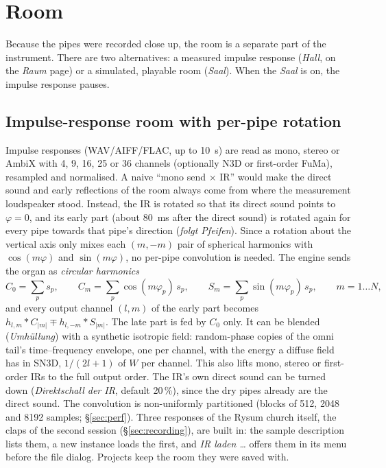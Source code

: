 \documentclass[11pt,a4paper,parskip=half,DIV=11,toc=bibliography]{scrartcl}
\newcommand{\ui}[1]{\emph{#1}}                 %
\begin{document}
\section{Room}
\label{sec:room}

Because the pipes were recorded close up, the room is a separate part of the instrument. There are two
alternatives: a measured impulse response (\ui{Hall}, on the \ui{Raum} page) or a simulated, playable
room (\ui{Saal}). When the \ui{Saal} is on, the impulse response pauses.

\subsection{Impulse-response room with per-pipe rotation}
\label{sec:ir}
Impulse responses (WAV/AIFF/FLAC, up to \SI{10}{s}) are read as mono, stereo or AmbiX with 4, 9, 16, 25 or
36 channels (optionally N3D or first-order FuMa), resampled and normalised. A naive \enquote{mono send
$\times$ IR} would make the direct sound and early reflections of the room always come from where the
measurement loudspeaker stood. Instead, the IR is rotated so that its direct sound points to $\varphi=0$,
and its early part (about \SI{80}{ms} after the direct sound) is rotated again for every pipe towards that
pipe's direction (\ui{folgt Pfeifen}). Since a rotation about the vertical axis only mixes each $(m,-m)$
pair of spherical harmonics with $\cos(m\varphi)$ and $\sin(m\varphi)$, no per-pipe convolution is needed.
The engine sends the organ as \emph{circular harmonics}
\begin{equation}
  C_0 = \sum_p s_p,\qquad C_m = \sum_p \cos(m\varphi_p)\, s_p,\qquad S_m = \sum_p \sin(m\varphi_p)\, s_p,
  \qquad m = 1\dots N,
\end{equation}
and every output channel $(l,m)$ of the early part becomes
$h_{l,m} * C_{|m|} \mp h_{l,-m} * S_{|m|}$. The late part is fed by $C_0$ only. It can be blended
(\ui{Umhüllung}) with a synthetic isotropic field: random-phase copies of the omni tail's
time--frequency envelope, one per channel, with the energy a diffuse field has in SN3D, $1/(2l+1)$ of
$W$ per channel. This also lifts mono, stereo or first-order IRs to the full output order. The IR's own
direct sound can be turned down (\ui{Direktschall der IR}, default 20\,\%), since the dry pipes already
are the direct sound. The convolution is non-uniformly partitioned (blocks of 512, 2048 and 8192 samples; \S\ref{sec:perf}).
Three responses of the Rysum church itself, the claps of the second session (\S\ref{sec:recording}), are built in: the sample description
lists them, a new instance loads the first, and \ui{IR laden \dots} offers them in its menu before the file dialog. Projects keep the room
they were saved with.
\end{document}
